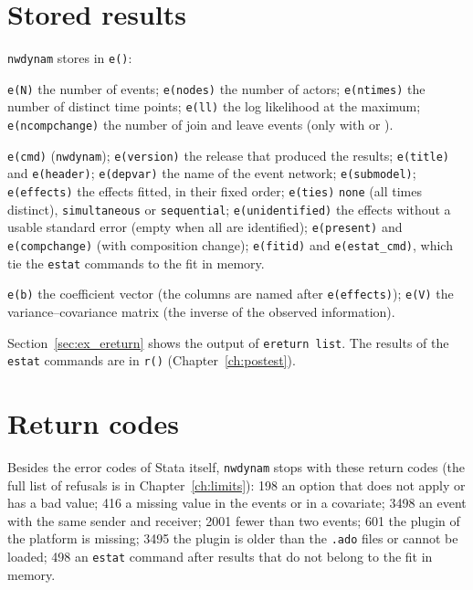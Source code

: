 \section{Stored results}\label{sec:stored}

\texttt{nwdynam} stores in \texttt{e()}:
\begin{description}[style=nextline,nosep]
  \item[Scalars] \texttt{e(N)} the number of events; \texttt{e(nodes)} the number of actors; \texttt{e(ntimes)} the number of distinct time points; \texttt{e(ll)} the log likelihood at the maximum; \texttt{e(ncompchange)} the number of join and leave events (only with  or ).
  \item[Macros] \texttt{e(cmd)} (\texttt{nwdynam}); \texttt{e(version)} the release that produced the results; \texttt{e(title)} and \texttt{e(header)}; \texttt{e(depvar)} the name of the event network; \texttt{e(submodel)}; \texttt{e(effects)} the effects fitted, in their fixed order; \texttt{e(ties)} \texttt{none} (all times distinct), \texttt{simultaneous} or \texttt{sequential}; \texttt{e(unidentified)} the effects without a usable standard error (empty when all are identified); \texttt{e(present)} and \texttt{e(compchange)} (with composition change); \texttt{e(fitid)} and \texttt{e(estat\_cmd)}, which tie the \texttt{estat} commands to the fit in memory.
  \item[Matrices] \texttt{e(b)} the coefficient vector (the columns are named after \texttt{e(effects)}); \texttt{e(V)} the variance--covariance matrix (the inverse of the observed information).
\end{description}
Section~\ref{sec:ex_ereturn} shows the output of \texttt{ereturn list}. The results of the \texttt{estat} commands are in \texttt{r()} (Chapter~\ref{ch:postest}).

\section{Return codes}

Besides the error codes of Stata itself, \texttt{nwdynam} stops with these return codes (the full list of refusals is in Chapter~\ref{ch:limits}): 198 an option that does not apply or has a bad value; 416 a missing value in the events or in a covariate; 3498 an event with the same sender and receiver; 2001 fewer than two events; 601 the plugin of the platform is missing; 3495 the plugin is older than the \texttt{.ado} files or cannot be loaded; 498 an \texttt{estat} command after results that do not belong to the fit in memory.
